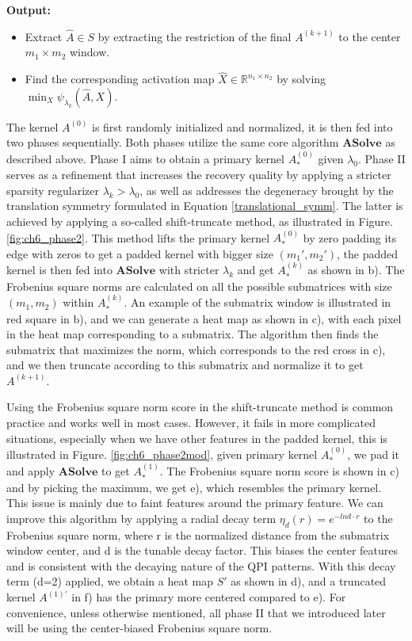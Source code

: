 \begin{algorithm}
	\textbf{Output:}
	\begin{itemize}
		\item Extract $\hat{A} \in S$ by extracting the restriction of the final $A^{(k+1)}$ to the center $m_1 \times m_2$ window.
		\item Find the corresponding activation map $\hat{X} \in \mathbb{R}^{n_1 \times n_2}$ by solving $\min_{X} \psi_{\lambda_k}(\hat{A}, X)$.
	\end{itemize}
\end{algorithm}

The kernel $A^{(0)}$ is first randomly initialized and normalized, it is then fed into two phases sequentially. Both phases utilize the same core algorithm $\mathbf{ASolve}$ as described above. Phase I aims to obtain a primary kernel $A^{(0)}_*$ given $\lambda_0$. Phase II serves as a refinement that increases the recovery quality by applying a stricter sparsity regularizer $\lambda_{k} > \lambda_0$, as well as addresses the degeneracy brought by the translation symmetry formulated in Equation \ref{translational_symm}. The latter is achieved by applying a so-called shift-truncate method, as illustrated in Figure. \ref{fig:ch6_phase2}. This method lifts the primary kernel $A^{(0)}_*$ by zero padding its edge with zeros to get a padded kernel with bigger size $(m_1',m_2')$, the padded kernel is then fed into $\mathbf{ASolve}$ with stricter $\lambda_{k}$ and get $A^{(k)}_*$ as shown in b). The Frobenius square norms are calculated on all the possible submatrices with size $(m_1,m_2)$ within $A^{(k)}_*$. An example of the submatrix window is illustrated in red square in b), and we can generate a heat map as shown in c), with each pixel in the heat map corresponding to a submatrix. The algorithm then finds the submatrix that maximizes the norm, which corresponds to the red cross in c), and we then truncate according to this submatrix and normalize it to get $A^{(k+1)}$. 

Using the Frobenius square norm score in the shift-truncate method is common practice and works well in most cases. However, it fails in more complicated situations, especially when we have other features in the padded kernel, this is illustrated in Figure. \ref{fig:ch6_phase2mod}, given primary kernel $A^{(0)}_*$, we pad it and apply $\mathbf{ASolve}$ to get $A^{(1)}_*$. The Frobenius square norm score is shown in c) and by picking the maximum, we get e), which resembles the primary kernel. This issue is mainly due to faint features around the primary feature. We can improve this algorithm by applying a radial decay term $\eta_d(r) = e^{-lnd \cdot r}$ to the Frobenius square norm, where r is the normalized distance from the submatrix window center, and d is the tunable decay factor. This biases the center features and is consistent with the decaying nature of the QPI patterns. With this decay term (d=2) applied, we obtain a heat map $S'$ as shown in d), and a truncated kernel $A^{(1)'}$ in f) has the primary more centered compared to e). For convenience, unless otherwise mentioned, all phase II that we introduced later will be using the center-biased Frobenius square norm. 

